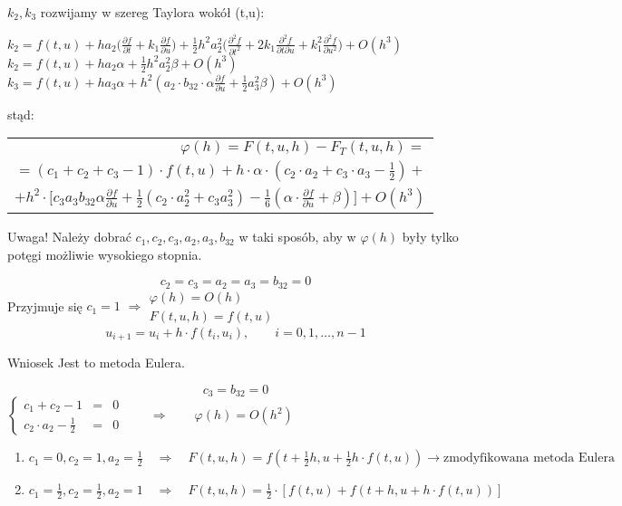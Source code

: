 \begin{frame}
	$k_2, k_3$ rozwijamy w szereg Taylora wokół (t,u):
    \begin{flushleft}
    	$k_2=f(t,u)+ha_2\bigg(\frac{\partial f}{\partial t}+k_1\frac{\partial f}{\partial u}\bigg) + \frac{1}{2}h^2a_2^2\bigg(\frac{\partial^2f}{\partial t^2}+2k_1\frac{\partial^2f}{\partial t \partial u}+k_1^2\frac{\partial^2f}{\partial u^2}\bigg)+O(h^3)$ \newline
        $k_2 = f(t,u)+ha_2\alpha+\frac{1}{2}h^2a_2^2\beta+O(h^3)$ \newline
        $k_3 = f(t,u)+ha_3\alpha + h^2(a_2 \cdot b_{32} \cdot \alpha \frac{\partial f}{\partial u} + \frac{1}{2}a_3^2\beta) + O(h^3)$
    \end{flushleft}
    stąd:
    \begin{tabular}{r}
    	$\varphi(h) = F(t,u,h) - F_T(t,u,h) = $\\
    	$ = (c_1+c_2+c_3-1) \cdot f(t,u)+h \cdot \alpha \cdot (c_2 \cdot a_2 + c_3 \cdot a_3 - \frac{1}{2}) + $ \\
        $+ h^2 \cdot \big[c_3a_3b_{32}\alpha\frac{\partial f}{\partial u}+\frac{1}{2}(c_2 \cdot a_2^2 +c_3a_3^2)-\frac{1}{6}(\alpha \cdot \frac{\partial f}{\partial u}+\beta)\big]+O(h^3) $
    \end{tabular}
    \begin{block}{Uwaga!}
    	Należy dobrać $c_1, c_2, c_3, a_2, a_3, b_{32}$ w taki sposób, aby w $\varphi(h)$ były tylko potęgi możliwie wysokiego stopnia.
    \end{block}
\end{frame}
\begin{frame}
    $$c_2=c_3=a_2=a_3=b_{32}=0$$
    Przyjmuje się $c_1 = 1$ \qquad $\Rightarrow \left.\begin{array}{l}
    \varphi(h) = O(h) \\
    F(t,u,h) = f(t,u)
    \end{array}\right.$
    $$u_{i+1} = u_i + h \cdot f(t_i,u_i), \qquad i = 0,1, \ldots,n-1$$
    \begin{block}{Wniosek}
    	Jest to metoda Eulera.
    \end{block}
\end{frame}
\begin{frame}
    $$c_3 = b_{32} = 0$$
    $\left\{\begin{array}{rcl}
    	c_1 + c_2 - 1 & = & 0\\
        c_2 \cdot a_2 - \frac{1}{2} & = & 0
    \end{array}\right. \qquad\Rightarrow \qquad \varphi(h) = O(h^2)$
    \begin{enumerate}
      \item $c_1 = 0, c_2 = 1, a_2 = \frac{1}{2} \quad \Rightarrow \quad F(t,u,h) = f(t+\frac{1}{2}h, u+\frac{1}{2}h \cdot f(t,u)) \rightarrow \text{zmodyfikowana metoda Eulera}$
      \item $c_1 = \frac{1}{2}, c_2 = \frac{1}{2}, a_2 = 1 \quad\Rightarrow\quad F(t,u,h) = \frac{1}{2} \cdot[f(t,u)+f(t+h,u+h \cdot f(t,u))]$
    \end{enumerate}
\end{frame}
